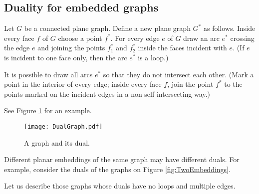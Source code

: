 

\setcounter{section}{3}
\setcounter{subsection}{4}
\setcounter{dfn}{11}

\subsection{Duality for embedded graphs}
Let $G$ be a connected plane graph.
Define a new plane graph $G^*$ as follows.
Inside every face $f$ of $G$ choose a point $f^*$.
For every edge $e$ of $G$ draw an arc $e^*$ crossing the edge $e$ and joining the points $f_1^*$ and $f_2^*$ inside the faces incident with $e$.
(If $e$ is incident to one face only, then the arc $e^*$ is a loop.)

It is possible to draw all arcs $e^*$ so that they do not intersect each other.
(Mark a point in the interior of every edge;
inside every face $f$, join the point $f^*$ to the points marked on the incident edges in a non-self-intersecting way.)

See Figure \ref{fig:DualGraph} for an example.

\begin{figure}[ht]
\begin{center}
\texttt{[image: DualGraph.pdf]}
\end{center}
\caption{A graph and its dual.}
\label{fig:DualGraph}
\end{figure}

Different planar embeddings of the same graph may have different duals.
For example, consider the duals of the graphs on Figure \ref{fig:TwoEmbeddings}.

Let us describe those graphs whose duals have no loops and multiple edges.


